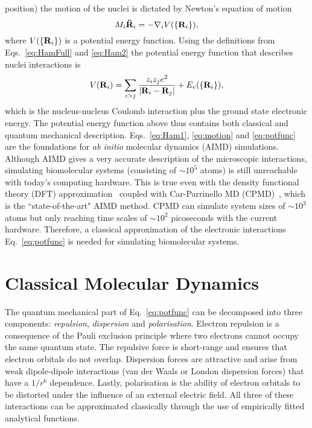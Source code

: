 position) the motion of the nuclei is dictated by Newton's equation of motion
\begin{equation}
M_{i}{\bf \ddot{R}}_{i} = -\nabla_{i}V(\{{\bf R}_{i}\}),
\label{eq:motion}
\end{equation}
where $V(\{{\bf R}_{i}\})$ is a potential energy function. Using the definitions from 
Eqs.~\eqref{eq:HamFull} and \eqref{eq:Ham2} the potential energy function that describes nuclei 
interactions is
\begin{equation}
V({{\bf R}_{i}}) = \sum_{i>j} \frac{z_{i}z_{j}e^2}{|{\bf R}_{i} - {\bf R}_{j}|} + E_{e}(\{{\bf R}_{i}\}),
\label{eq:potfunc}
\end{equation}
which is the nucleus-nucleus Coulomb interaction plus the ground state electronic energy. The 
potential energy function above thus contains both classical and quantum mechanical description. 
Eqs.~\eqref{eq:Ham1}, \eqref{eq:motion} and \eqref{eq:potfunc} are the foundations for {\it ab 
initio} molecular dynamics (AIMD) simulations. Although AIMD gives a very accurate description 
of the microscopic interactions, simulating biomolecular systems (consisting of ${\sim}10^5$ atoms) 
is still unreachable with today's computing hardware. This is true even with the density functional 
theory (DFT) approximation~\cite{Kohn1965,Rajagopal1973} coupled with Car-Parrinello MD 
(CPMD)~\cite{Car1985}, which is the ``state-of-the-art" AIMD method. CPMD can simulate system sizes 
of ${\sim}10^3$ atoms but only reaching time scales of ${\sim}10^2$ picoseconds with the current 
hardware. Therefore, a classical approximation of the electronic interactions Eq.~\eqref{eq:potfunc} 
is needed for simulating biomolecular systems.

\section{Classical Molecular Dynamics}
\label{sec:cmd}
The quantum mechanical part of Eq.~\eqref{eq:potfunc} can be decomposed into three components: 
{\it repulsion}, {\it dispersion} and {\it polarisation}. Electron repulsion is a consequence 
of the Pauli exclusion principle where two electrons cannot occupy the same quantum state. The 
repulsive force is short-range and ensures that electron orbitals do not overlap. Dispersion 
forces are attractive and arise from weak dipole-dipole interactions (van der Waals or London 
dispersion forces) that have a $1/r^6$ dependence. Lastly, polarisation is the ability of 
electron orbitals to be distorted under the influence of an external electric field. All three 
of these interactions can be approximated classically through the use of empirically fitted 
analytical functions. 

